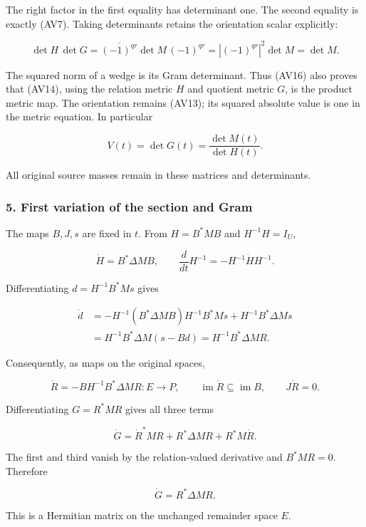 The right factor in the first equality has determinant one. The second equality is exactly (AV7). Taking determinants retains the orientation scalar explicitly:

\[
\det H\,\det G
=\overline{(-1)^{qr}}\det M\,(-1)^{qr}
=|(-1)^{qr}|^2\det M=\det M.
\tag{AV16}
\]

The squared norm of a wedge is its Gram determinant. Thus (AV16) also proves that (AV14), using the relation metric \(H\) and quotient metric \(G\), is the product metric map. The orientation remains (AV13); its squared absolute value is one in the metric equation. In particular

\[
V(t)=\det G(t)=\frac{\det M(t)}{\det H(t)}.
\tag{AV17}
\]

All original source masses remain in these matrices and determinants.

\subsubsection{5. First variation of the section and Gram}\label{endpoint-variation_review--first-variation-of-the-section-and-gram}

The maps \(B,J,s\) are fixed in \(t\). From \(H=B^*MB\) and \(H^{-1}H=I_U\),

\[
\dot H=B^*\Delta M B,\qquad
\frac{d}{dt}H^{-1}=-H^{-1}\dot H H^{-1}.
\tag{AV18}
\]

Differentiating \(d=H^{-1}B^*Ms\) gives

\[
\begin{aligned}
\dot d
&=-H^{-1}(B^*\Delta M B)H^{-1}B^*Ms+H^{-1}B^*\Delta M s\\
&=H^{-1}B^*\Delta M(s-Bd)
=H^{-1}B^*\Delta M R.
\end{aligned}
\tag{AV19}
\]

Consequently, as maps on the original spaces,

\[
\dot R=-BH^{-1}B^*\Delta M R:E\longrightarrow P,\qquad
\operatorname{im}\dot R\subseteq\operatorname{im}B,\qquad J\dot R=0.
\tag{AV20}
\]

Differentiating \(G=R^*MR\) gives all three terms

\[
\dot G=\dot R^*MR+R^*\Delta M R+R^*M\dot R.
\tag{AV21}
\]

The first and third vanish by the relation-valued derivative and \(B^*MR=0\). Therefore

\[
\dot G=R^*\Delta M R.
\tag{AV22}
\]

This is a Hermitian matrix on the unchanged remainder space \(E\).

